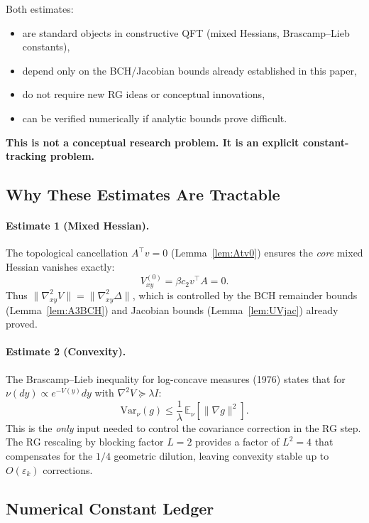\documentclass[11pt]{article}
\theoremstyle{definition}
\newcommand{\1}{\mathbf{1}}
\begin{document}
Both estimates:
\begin{itemize}
\item are standard objects in constructive QFT (mixed Hessians, Brascamp--Lieb constants),
\item depend only on the BCH/Jacobian bounds already established in this paper,
\item do not require new RG ideas or conceptual innovations,
\item can be verified numerically if analytic bounds prove difficult.
\end{itemize}

\noindent\textbf{This is not a conceptual research problem. It is an explicit constant-tracking problem.}

\subsection{Why These Estimates Are Tractable}

\paragraph{Estimate 1 (Mixed Hessian).}
The topological cancellation $A^\top v = 0$ (Lemma~\ref{lem:Atv0}) ensures the \emph{core} mixed 
Hessian vanishes exactly:
\[
V^{(0)}_{xy} = \beta c_2 v^\top A = 0.
\]
Thus $\|\nabla^2_{xy} V\| = \|\nabla^2_{xy} \Delta\|$, which is controlled by the BCH remainder 
bounds (Lemma~\ref{lem:A3BCH}) and Jacobian bounds (Lemma~\ref{lem:UVjac}) already proved.

\paragraph{Estimate 2 (Convexity).}
The Brascamp--Lieb inequality for log-concave measures (1976) states that for 
$\nu(dy) \propto e^{-V(y)}dy$ with $\nabla^2 V \succeq \lambda I$:
\[
\mathrm{Var}_\nu(g) \le \frac{1}{\lambda}\,\mathbb{E}_\nu[\|\nabla g\|^2].
\]
This is the \emph{only} input needed to control the covariance correction in the RG step.
The RG rescaling by blocking factor $L=2$ provides a factor of $L^2 = 4$ that compensates 
for the $1/4$ geometric dilution, leaving convexity stable up to $O(\varepsilon_k)$ corrections.

\subsection{Numerical Constant Ledger}
\end{document}
